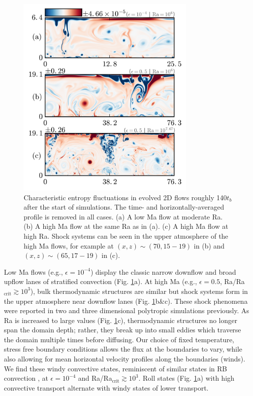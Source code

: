 \documentclass[aps, prl, twocolumn, nofootinbib, groupedaddress, amsfonts, amssymb, amsmath]{revtex4-1}
\begin{document}
\begin{figure}[t]
\includegraphics[width=3.4375in]{./figs/snapshots_fig.png}
\caption{Characteristic entropy fluctuations in evolved 2D flows roughly
140$t_b$ after the start of simulations. 
The time- and horizontally-averaged profile is removed in all cases.  
(a) A low Ma flow at moderate Ra. (b) A high Ma flow at the same Ra as in (a).
(c) A high Ma flow at high Ra.
Shock systems can be seen in the upper atmosphere of the high Ma flows,
for example at $(x, z) \sim (70, 15-19)$ in (b) and $(x, z) \sim 
(65, 17-19)$ in (c).
\label{fig:entropy_snapshots} }
\end{figure}

Low Ma flows (e.g., $\epsilon = 10^{-4}$)
display the classic narrow downflow and broad upflow lanes of stratified
convection (Fig. \ref{fig:entropy_snapshots}a).
At high Ma (e.g., $\epsilon = 0.5$, Ra/Ra$_{\text{crit}} \gtrsim 10^3$), 
bulk thermodynamic structures are similar but
shock systems form in the upper atmosphere near downflow lanes 
(Fig. \ref{fig:entropy_snapshots}b\&c).
These shock phenomena were reported in
two \cite{cattaneo&all1990} and 
three \cite{malagoli&all1990} dimensional polytropic simulations previously.
As Ra is increased to large values 
(Fig. \ref{fig:entropy_snapshots}c), thermodynamic structures 
no longer span the domain depth; rather, they break up into 
small eddies which traverse the domain multiple
times before diffusing.  Our choice of fixed temperature, stress free boundary conditions 
allows the flux at the boundaries to vary, while also allowing
for mean horizontal velocity profiles along the boundaries (winds).
We find these windy convective states, reminiscent of similar states
in RB convection \cite{goluskin&all2014}, at $\epsilon = 10^{-4}$ and
Ra/Ra$_{\text{crit}} \gtrsim 10^{3}$. Roll states (Fig. \ref{fig:entropy_snapshots}a) with high convective
transport alternate with windy states of lower transport.
\end{document}
